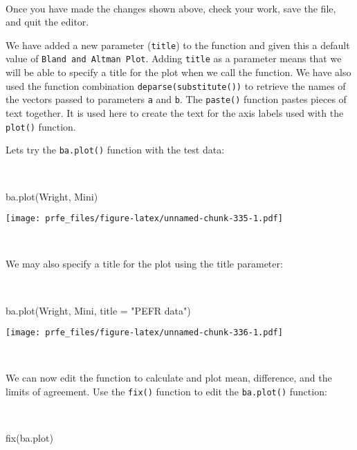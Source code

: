 \documentclass[
  12pt,
  a4paper]{book}
\newenvironment{Shaded}{\begin{snugshade}}{\end{snugshade}}
\newcommand{\AttributeTok}[1]{\textcolor[rgb]{0.77,0.63,0.00}{#1}}
\newcommand{\FunctionTok}[1]{\textcolor[rgb]{0.00,0.00,0.00}{#1}}
\newcommand{\NormalTok}[1]{#1}
\newcommand{\StringTok}[1]{\textcolor[rgb]{0.31,0.60,0.02}{#1}}
\begin{document}
~

Once you have made the changes shown above, check your work, save the file, and quit the editor.

We have added a new parameter (\texttt{title}) to the function and given this a default value of \texttt{Bland\ and\ Altman\ Plot}. Adding \texttt{title} as a parameter means that we will be able to specify a title for the plot when we call the function. We have also used the function combination \texttt{deparse(substitute())} to retrieve the names of the vectors passed to parameters \texttt{a} and \texttt{b}. The \texttt{paste()} function pastes pieces of text together. It is used here to create the text for the axis labels used with the \texttt{plot()} function.

Lets try the \texttt{ba.plot()} function with the test data:

~

\begin{Shaded}
\begin{Highlighting}[]
\FunctionTok{ba.plot}\NormalTok{(Wright, Mini)}
\end{Highlighting}
\end{Shaded}

\texttt{[image: prfe\_files/figure-latex/unnamed-chunk-335-1.pdf]}

~

We may also specify a title for the plot using the title parameter:

~

\begin{Shaded}
\begin{Highlighting}[]
\FunctionTok{ba.plot}\NormalTok{(Wright, Mini, }\AttributeTok{title =} \StringTok{"PEFR data"}\NormalTok{)}
\end{Highlighting}
\end{Shaded}

\texttt{[image: prfe\_files/figure-latex/unnamed-chunk-336-1.pdf]}

~

We can now edit the function to calculate and plot mean, difference, and the limits of agreement. Use the \texttt{fix()} function to edit the \texttt{ba.plot()} function:

~

\begin{Shaded}
\begin{Highlighting}[]
\FunctionTok{fix}\NormalTok{(ba.plot)}
\end{Highlighting}
\end{Shaded}
\end{document}
